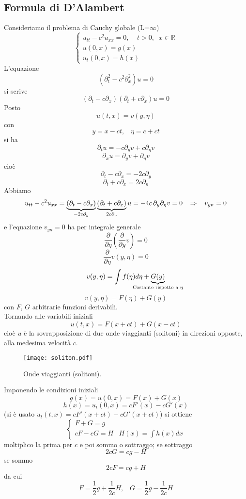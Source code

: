 \subsection{Formula di D'Alambert}
Consideriamo il problema di Cauchy globale (L=$\infty$)
\[
	\begin{cases}
		u_{tt} - c^2 u_{xx}= 0 , \;\;\;\; t>0, \;\; x \in \mathbb{R} \\
		u(0,x)= g(x)\\
		u_t (0,x)= h(x)
	\end{cases}
\]
L'equazione
\[
	\left( \partial_t^2 -c^2 \partial_x^2 \right) u=0
\]
si scrive
\[
	\left( \partial_t -c \partial_x \right)\left( \partial_t + c
	\partial_x \right) u=0
\]
Posto
\[
	u(t,x)= v(y,\eta)
\]
con
\[
	y=x -ct, \;\;\; \eta= c+ ct
\]
si ha
\[
	\partial_tu= -c \partial_y v + c\partial_\eta v
\]
\[
	\partial_xu= \partial_y v + \partial_\eta v
\]
cio\`e
\[
	\partial_t - c \partial_x = -2c \partial_y
\]
\[
	\partial_t + c\partial_x = 2c \partial_n
\]
Abbiamo
\[
	u_{tt}- c^2u_{xx}= \underbrace{\left( \partial_t -c \partial_x
	\right)}_{-2c \partial_y}
	\underbrace{\left( \partial_t + c
	\partial_x \right)}_{2c \partial_\eta} u= -4c \, \partial_{y}
	\partial_{\eta} v=0
	\;\;\; \Rightarrow \;\;\; v_{yn}=0
\]
e l'equazione $v_{yn}=0$ ha per integrale generale
\[
	\frac{\partial}{\partial \eta} \left(
	\frac{\partial}{\partial y} v \right)=0
\]
\[
	\frac{\partial}{\partial \eta} v (y, \eta)=0
\]
\[
	v(y, \eta)= \int f(\eta) d\eta + \underbrace{ G(y) }_{\mathclap{
	\text{Costante rispetto a }\eta}}
\]
\[
	v(y, \eta)= F(\eta)+ G(y)
\]
con $F$, $G$ arbitrarie funzioni derivabili.\\
Tornando alle variabili iniziali
\[
	u(t,x)=F(x+ct)+G(x-ct)
\]
cio\`e $u$ \`e la sovrapposizione di due onde viaggianti (solitoni) in
direzioni opposte, alla medesima velocit\`a $c$.
\begin{figure}[H]
	\centering
	\texttt{[image: soliton.pdf]}
	\caption{Onde viaggianti (solitoni).}
	\label{soliton}
\end{figure}
\noindent
Imponendo le condizioni iniziali
\[
	g(x)= u(0,x)= F(x)+ G(x)
\]
\[
	h(x)=u_t(0,x)=cF'(x)- cG'(x)
\]
(si \`e usato $u_t(t,x)= cF'(x+ct)- cG'(x+ct)$)
si ottiene
\[
	\left\{
	\begin{array}{ll}
		F+G= g\\
		cF-cG= H & H(x)= \int h(x)dx
	\end{array}
	\right.
\]
moltiplico la prima per $c$ e poi sommo o sottraggo; se sottraggo
\[
	2cG= cg - H
\]
se sommo
\[
	2cF= cg + H
\]
da cui
\[
	F=\frac{1}{2}g + \frac{1}{2c}H, \;\;\; G=\frac{1}{2}g-\frac{1}{2c}H
\]
